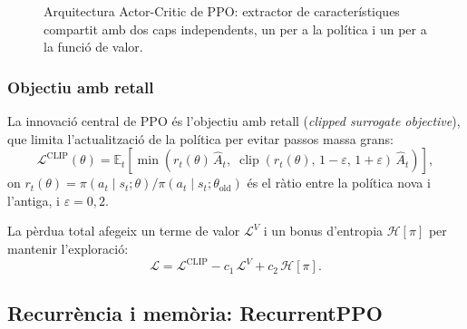 \begin{figure}[H]
  \centering
  \caption[Arquitectura Actor-Critic de \acs{PPO}.]{Arquitectura Actor-Critic de \acs{PPO}: extractor de característiques compartit amb dos caps independents, un per a la política i un per a la funció de valor.}
  \label{fig:actor-critic}
\end{figure}

\subsubsection*{Objectiu amb retall}

La innovació central de PPO és l'objectiu amb retall (\emph{clipped
surrogate objective}), que limita l'actualització de la política per evitar
passos massa grans:
\[
  \mathcal{L}^{\mathrm{CLIP}}(\theta) =
  \mathbb{E}_t\!\left[
    \min\!\left(
      r_t(\theta)\,\hat{A}_t,\;
      \operatorname{clip}(r_t(\theta),\,1-\varepsilon,\,1+\varepsilon)\,\hat{A}_t
    \right)
  \right],
\]
on $r_t(\theta) = \pi(a_t \mid s_t; \theta) / \pi(a_t \mid s_t; \theta_{\mathrm{old}})$
és el ràtio entre la política nova i l'antiga, i $\varepsilon = 0{,}2$.

La pèrdua total afegeix un terme de valor $\mathcal{L}^{V}$ i un bonus
d'entropia $\mathcal{H}[\pi]$ per mantenir l'exploració:
\[
  \mathcal{L} = \mathcal{L}^{\mathrm{CLIP}} - c_1\,\mathcal{L}^{V}
  + c_2\,\mathcal{H}[\pi].
\]

\subsection{Recurrència i memòria: RecurrentPPO}
\label{sec:recurrencia}

